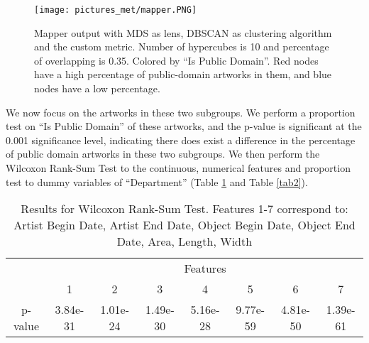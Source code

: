 \documentclass[12pt]{article}
\theoremstyle{definition}
\begin{document}
\begin{figure}[H]
\centering\texttt{[image: pictures\_met/mapper.PNG]}
\caption{Mapper output with MDS as lens, DBSCAN as clustering algorithm and the custom metric. Number of hypercubes is 10 and percentage of overlapping is 0.35. Colored by ``Is Public Domain''. Red nodes have a high percentage of public-domain artworks in them, and blue nodes have a low percentage.}
\label{met_mapper}
\end{figure}
We now focus on the artworks in these two subgroups. We perform a proportion test on ``Is Public Domain'' of these artworks, and the p-value is significant at the 0.001 significance level, indicating there does exist a difference in the percentage of public domain artworks in these two subgroups. We then perform the Wilcoxon Rank-Sum Test to the continuous, numerical features and proportion test to dummy variables of ``Department'' (Table \ref{tab1} and Table \ref{tab2}).
\begin{table}[htbp]
        \centering
        \begin{tabular}{c|c|c|c|c|c|c|c|}
            \cline{2-8}
             & \multicolumn{7}{|c|}{Features}\\
            \cline{2-8}
             & 1 & 2 & 3 & 4 & 5 & 6 & 7 \\
            \hline
            \multicolumn{1}{|c|}{p-value} & 3.84e-31 & 1.01e-24 &  1.49e-30 & 5.16e-28 & 9.77e-59 & 4.81e-50 & 1.39e-61\\
            \hline
        \end{tabular}
        \caption{Results for Wilcoxon Rank-Sum Test. Features 1-7 correspond to: Artist Begin Date, Artist End Date, Object Begin Date, Object End Date, Area, Length, Width}
        \label{tab1}
    \end{table}
\end{document}
